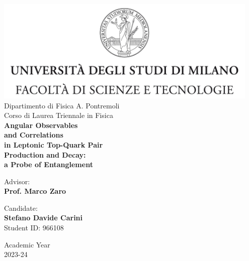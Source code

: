 \documentclass[12pt,a4paper, openright, twoside]{report}
\begin{document}
\begin{titlepage}
    \begin{center}
        \includegraphics[width=0.95\textwidth]{logo_unimi} \\[1cm]
        {\Large Dipartimento di Fisica A. Pontremoli} \\[0.6cm]
        {\Large Corso di Laurea Triennale in Fisica} \\[3cm]
        {\Huge \textbf{Angular Observables}} \\
        {\Huge \textbf{and Correlations}} \\
        {\Huge \textbf{in Leptonic Top-Quark Pair}} \\
        {\Huge \textbf{Production and Decay:}} \\
        {\Huge \textbf{a Probe of Entanglement}} \\[2cm]
        
        \vfill
        
        \begin{minipage}[t]{0.45\textwidth}
            \begin{flushleft} \large
                Advisor:\\
                \textbf{Prof. Marco Zaro}
            \end{flushleft}
        \end{minipage}
        \begin{minipage}[t]{0.45\textwidth}
            \vspace{3cm} 
            \begin{flushright} \large
                Candidate: \\
                \textbf{Stefano Davide Carini} \\
                Student ID: 966108
            \end{flushright}
        \end{minipage}
        
        \vfill
        
        {\large Academic Year \\ 2023-24}
        
    \end{center}
\end{titlepage}
\end{document}
